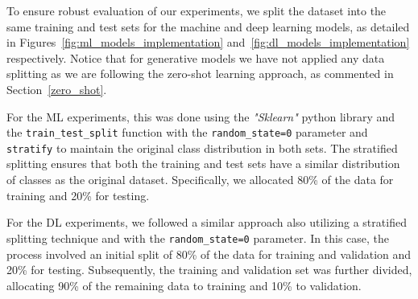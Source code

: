 
To ensure robust evaluation of our experiments, we split the dataset into the same training and test sets for the machine and deep learning models, as detailed in Figures~\ref{fig:ml_models_implementation} and~\ref{fig:dl_models_implementation} respectively. Notice that for generative models we have not applied any data splitting as we are following the zero-shot learning approach, as commented in Section~\ref{zero_shot}.

For the ML experiments, this was done using the \textit{"Sklearn"} python library and the \texttt{train\_test\_split} function with the \texttt{random\_state=0} parameter and \texttt{stratify} to maintain the original class distribution in both sets. The stratified splitting ensures that both the training and test sets have a similar distribution of classes as the original dataset. Specifically, we allocated 80\% of the data for training and 20\% for testing. 

For the DL experiments, we followed a similar approach also utilizing a stratified splitting technique and with the \texttt{random\_state=0} parameter. In this case, the process involved an initial split of 80\% of the data for training and validation and 20\% for testing. Subsequently, the training and validation set was further divided, allocating 90\% of the remaining data to training and 10\% to validation. 

\newpage

